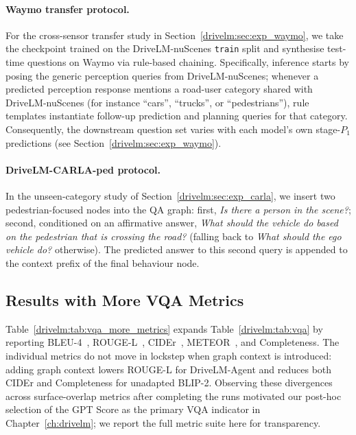 \paragraph{Waymo transfer protocol.}
For the cross-sensor transfer study in Section~\ref{drivelm:sec:exp_waymo}, we take the checkpoint trained on the DriveLM-nuScenes \texttt{train} split and synthesise test-time questions on Waymo via rule-based chaining. Specifically, inference starts by posing the generic perception queries from DriveLM-nuScenes; whenever a predicted perception response mentions a road-user category shared with DriveLM-nuScenes (for instance ``cars'', ``trucks'', or ``pedestrians''), rule templates instantiate follow-up prediction and planning queries for that category. Consequently, the downstream question set varies with each model's own stage-$P_1$ predictions (see Section~\ref{drivelm:sec:exp_waymo}).

\paragraph{DriveLM-CARLA-ped protocol.}
In the unseen-category study of Section~\ref{drivelm:sec:exp_carla}, we insert two pedestrian-focused nodes into the QA graph: first, \emph{Is there a person in the scene?}; second, conditioned on an affirmative answer, \emph{What should the vehicle do based on the pedestrian that is crossing the road?} (falling back to \emph{What should the ego vehicle do?} otherwise). The predicted answer to this second query is appended to the context prefix of the final behaviour node.

\subsection{Results with More VQA Metrics}\label{drivelm:app:vqa_metrics}

Table~\ref{drivelm:tab:vqa_more_metrics} expands Table~\ref{drivelm:tab:vqa} by reporting BLEU-4~\cite{papineni2002bleu}, ROUGE-L~\cite{lin2004rouge}, CIDEr~\cite{vedantam2015cider}, METEOR~\cite{lavie-agarwal-2007-meteor}, and Completeness. The individual metrics do not move in lockstep when graph context is introduced: adding graph context lowers ROUGE-L for DriveLM-Agent and reduces both CIDEr and Completeness for unadapted BLIP-2. Observing these divergences across surface-overlap metrics after completing the runs motivated our post-hoc selection of the GPT Score as the primary VQA indicator in Chapter~\ref{ch:drivelm}; we report the full metric suite here for transparency.

